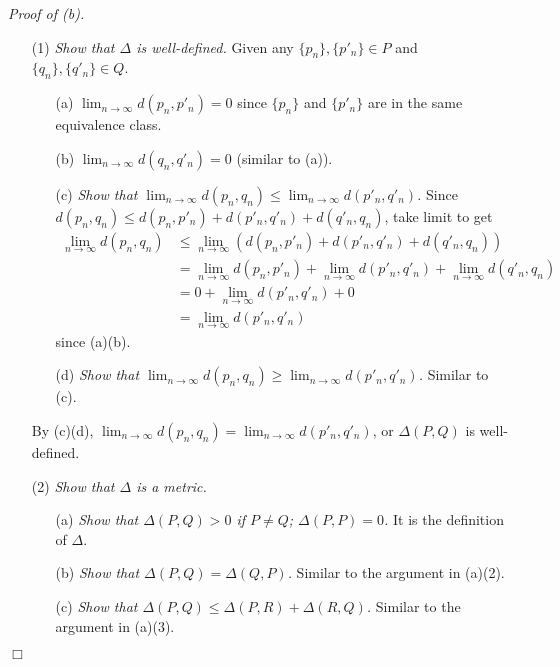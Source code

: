 \documentclass{article}
\begin{document}
\emph{Proof of (b).}
\begin{enumerate}
\item[(1)]
\emph{Show that $\Delta$ is well-defined.}
Given any $\{p_n\}, \{p'_n\} \in P$ and $\{q_n\}, \{q'_n\} \in Q$.
  \begin{enumerate}
  \item[(a)]
  $\lim_{n \to \infty}d(p_n,p'_n) = 0$
  since $\{p_n\}$ and $\{p'_n\}$ are in the same equivalence class.
  \item[(b)]
  $\lim_{n \to \infty}d(q_n,q'_n) = 0$ (similar to (a)).
  \item[(c)]
  \emph{Show that $\lim_{n \to \infty}d(p_n,q_n) \leq \lim_{n \to \infty}d(p'_n,q'_n)$.}
  Since $d(p_n,q_n) \leq d(p_n,p'_n)+d(p'_n,q'_n)+d(q'_n,q_n)$,
  take limit to get
  \begin{align*}
    \lim_{n \to \infty} d(p_n,q_n)
    &\leq \lim_{n \to \infty}(d(p_n,p'_n)+d(p'_n,q'_n)+d(q'_n,q_n)) \\
    &= \lim_{n \to \infty}d(p_n,p'_n)
      + \lim_{n \to \infty}d(p'_n,q'_n)
      + \lim_{n \to \infty}d(q'_n,q_n) \\
    &= 0 + \lim_{n \to \infty}d(p'_n,q'_n) + 0 \\
    &= \lim_{n \to \infty}d(p'_n,q'_n)
  \end{align*}
  since (a)(b).
  \item[(d)]
  \emph{Show that $\lim_{n \to \infty}d(p_n,q_n) \geq \lim_{n \to \infty}d(p'_n,q'_n)$.}
  Similar to (c).
  \end{enumerate}
By (c)(d), $\lim_{n \to \infty}d(p_n,q_n) = \lim_{n \to \infty}d(p'_n,q'_n)$,
or $\Delta(P,Q)$ is well-defined.
\item[(2)]
\emph{Show that $\Delta$ is a metric.}
  \begin{enumerate}
  \item[(a)]
  \emph{Show that $\Delta(P,Q) > 0$ if $P \neq Q$; $\Delta(P,P) = 0$.}
  It is the definition of $\Delta$.
  \item[(b)]
  \emph{Show that $\Delta(P,Q) = \Delta(Q,P)$.}
  Similar to the argument in (a)(2).
  \item[(c)]
  \emph{Show that $\Delta(P,Q) \leq \Delta(P,R) + \Delta(R,Q)$.}
  Similar to the argument in (a)(3).
  \end{enumerate}
\end{enumerate}
$\Box$ \\
\end{document}
